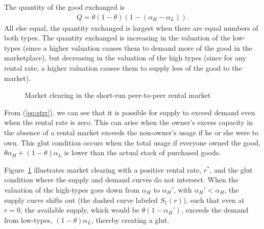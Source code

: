 \documentclass[11pt]{article}
\begin{document}
The quantity of the good exchanged is 
\begin{align} \label{eq:qty}
  Q = \theta (1-\theta) \left(1 - (\alpha_H - \alpha_L)\right).
\end{align} 
All else equal, the quantity exchanged is largest when there are equal numbers of both types.
The quantity exchanged is increasing in the valuation of the low-types (since a higher valuation causes them to demand more of the good in the marketplace), but decreasing in the valuation of the high types (since for any rental rate, a higher valuation causes them to supply less of the good to the market). 
 
\newcommand*{\alphaH}{0.80}%
\newcommand*{\alphaL}{0.50}%
\newcommand*{\alphaHp}{0.40}
\pgfmathsetmacro{\r}{-1 + \alphaH + \alphaL}%
\pgfmathsetmacro{\Q}{\alphaL - \r/2}
\begin{figure} 
\caption{Market clearing in the short-run peer-to-peer rental market} 
\label{fig:market_clearing} 
\begin{center}
\end{center}
\end{figure} 

From (\ref{eq:strr}), we can see that it is possible for supply to exceed demand even when the rental rate is zero. 
This can arise when the owner's excess capacity in the absence of a
rental market exceeds the non-owner's usage if he or she were to own. 
This glut condition occurs when the total usage if everyone owned the good, $\theta \alpha_H + (1-\theta)\alpha_L$ is lower than the actual stock of purchased goods. 

Figure~\ref{fig:market_clearing} illustrates market clearing with a positive rental rate, $r^*$, and the glut condition where the supply and demand curves do not intersect.
When the valuation of the high-types goes down from $\alpha_H$ to $\alpha_H'$, with $\alpha_H' < \alpha_H$, the supply curve shifts out (the dashed curve labeled $S_1(r)$), such that even at $r = 0$, the available supply, which would be $\theta (1-\alpha_H')$, exceeds the demand from low-types, $(1-\theta)\alpha_L$, thereby creating a glut.  
\end{document}

